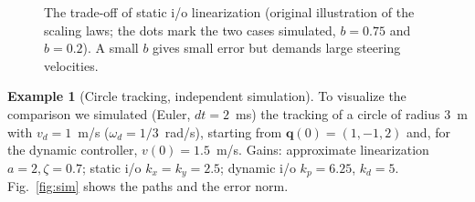 \documentclass[11pt,a4paper]{article}
\newcommand{\vect}[1]{\bm{#1}}
\newcommand{\vd}{v_d}
\newcommand{\omd}{\omega_d}
\theoremstyle{plain}
\theoremstyle{definition}
\newtheorem{example}[theorem]{Example}
\theoremstyle{remark}
\begin{document}
\begin{figure}[H]
\centering
{}
\caption{The trade-off of static i/o linearization (original illustration of the scaling laws; the dots mark the two cases simulated, $b=0.75$ and $b=0.2$). A small $b$ gives small error but demands large steering velocities.}
\label{fig:tradeoff}
\end{figure}

\begin{example}[Circle tracking, independent simulation]
To visualize the comparison we simulated (Euler, $dt=2$~ms) the tracking of a circle of radius $3$~m with $\vd=1$~m/s ($\omd=1/3$~rad/s), starting from $\vect q(0)=(1,-1,2)$ and, for the dynamic controller, $v(0)=1.5$~m/s. Gains: approximate linearization $a=2,\zeta=0.7$; static i/o $k_x=k_y=2.5$; dynamic i/o $k_p=6.25$, $k_d=5$. Fig.~\ref{fig:sim} shows the paths and the error norm.
\end{example}
\end{document}
